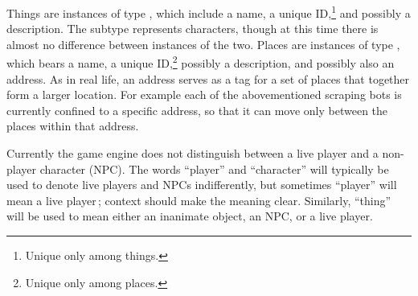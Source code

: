 Things are instances of type , which include a name,
a unique ID,\footnote{Unique only among things.} and possibly a description.
The subtype  represents characters, though at this time there
is almost no difference between instances of the two.
Places are instances of type , which bears a name,
a unique ID,\footnote{Unique only among places.}
possibly a description, and possibly also an address.
As in real life, an address serves as a tag for a set of places that together
form a larger location.
For example each of the abovementioned scraping bots is currently confined to
a specific address, so that it can move only between the places within that
address.

Currently the game engine does not distinguish between a live player and a
non-player character (NPC).
The words ``player'' and
``character'' will typically be used to denote live players and
NPCs indifferently, but sometimes ``player'' will mean a live player\,;
context should make the meaning clear.
Similarly, ``thing'' will be used to
mean either an inanimate object, an NPC, or a live player.